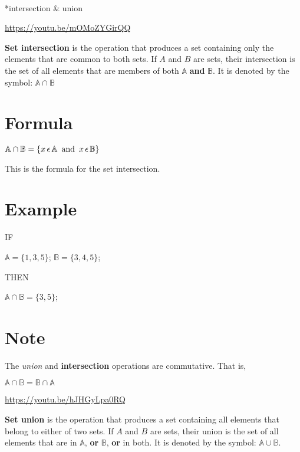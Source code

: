 \documentclass[
  letterpaper,
  DIV=11,
  numbers=noendperiod]{scrreprt}
\makeatletter
\let\oldparagraph\paragraph
\renewcommand{\paragraph}{
    \@ifstar
      \xxxParagraphStar
      \xxxParagraphNoStar
  }
\newcommand{\xxxParagraphStar}[1]{\oldparagraph*{#1}\mbox{}}
\newcommand{\xxxParagraphNoStar}[1]{\oldparagraph{#1}\mbox{}}
\makeatother
\begin{document}
\paragraph*{intersection \& union}\label{intersection-union}

\url{https://youtu.be/mOMoZYGirQQ}

{\textbf{Set intersection}} is the operation that produces a set
containing only the elements that are common to both sets. If \(A\) and
\(B\) are sets, their intersection is the set of all elements that are
members of both \(\mathbb{A}\) {\textbf{and}} \(\mathbb{B}\). It is
denoted by the symbol: \(\mathbb{A} \cap \mathbb{B}\)

\section{Formula}

\(\mathbb{A} \cap \mathbb{B} = \{ x \thinspace \epsilon \thinspace \mathbb{A} \enspace\text{and}\enspace x \thinspace \epsilon \thinspace \mathbb{B} \}\)

This is the formula for the set intersection.

\section{Example}

IF

\(\mathbb{A} = \{ 1,3,5 \}\); \(\mathbb{B} = \{ 3,4,5 \}\);

THEN

\(\mathbb{A} \cap \mathbb{B} = \{ 3,5 \}\);

\section{Note}

The \emph{union} and {\textbf{intersection}} operations are commutative.
That is,

\(\mathbb{A} \cap \mathbb{B} = \mathbb{B} \cap \mathbb{A}\)

\url{https://youtu.be/hJHGyLpa0RQ}

{\textbf{Set union}} is the operation that produces a set containing all
elements that belong to either of two sets. If \(A\) and \(B\) are sets,
their union is the set of all elements that are in \(\mathbb{A}\),
{\textbf{or}} \(\mathbb{B}\), {\textbf{or}} in both. It is denoted by
the symbol: \(\mathbb{A} \cup \mathbb{B}\).
\end{document}
